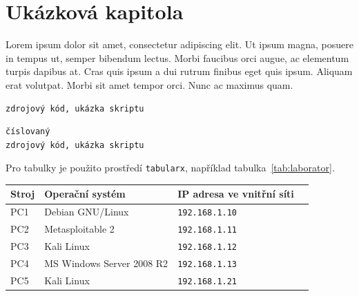 \documentclass{skripta}
\begin{document}







\chapter{Ukázková kapitola}

Lorem ipsum dolor sit amet, consectetur adipiscing elit. Ut ipsum magna, posuere in tempus ut, semper bibendum lectus. Morbi faucibus orci augue, ac elementum turpis dapibus at. Cras quis ipsum a dui rutrum finibus eget quis ipsum. Aliquam erat volutpat. Morbi sit amet tempor orci. Nunc ac maximus quam.

\lipsum[1][5-8]

\begin{code}
\begin{lstlisting}
zdrojový kód, ukázka skriptu
\end{lstlisting}
\end{code}

\lipsum[1][2-4]

\begin{code}
\begin{lstlisting}[style=numbered]
číslovaný
zdrojový kód, ukázka skriptu
\end{lstlisting}
\end{code}

Pro tabulky je použito prostředí {\tt tabularx}, například tabulka~\ref{tab:laborator}.

\begin{table}[htb]
\small
{}
\begin{tabularx}{\textwidth}{llll}
\toprule
Stroj & Operační systém & IP adresa ve vnitřní síti\\
\midrule
PC1 & Debian GNU/Linux & {\tt 192.168.1.10}\\
PC2 & Metasploitable 2 & {\tt 192.168.1.11}\\
PC3 & Kali Linux & {\tt 192.168.1.12}\\
PC4 & MS Windows Server 2008 R2 & {\tt 192.168.1.13}\\
PC5 & Kali Linux & {\tt 192.168.1.21}\\
\bottomrule
\end{tabularx} 
\end{table}
\end{document}
